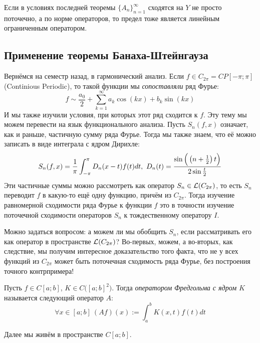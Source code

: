 \begin{corollary}
	Если в условиях последней теоремы $\{A_n\}_{n = 1}^\infty$ сходятся на $Y$ не просто поточечно, а по норме операторов, то предел тоже является линейным ограниченным оператором.
\end{corollary}

\subsection*{Применение теоремы Банаха-Штейнгауза}

\begin{problem}
	Вернёмся на семестр назад, в гармонический анализ. Если $f \in C_{2\pi} = CP[-\pi; \pi]$ (Continious Periodic), то такой функции мы \textit{сопоставляли} ряд Фурье:
	\[
		f \sim \frac{a_0}{2} + \sum_{k = 1}^\infty a_k\cos(kx) + b_k\sin(kx)
	\]
	И мы также изучили условия, при которых этот ряд сходится к $f$. Эту тему мы можем перевести на язык функционального анализа. Пусть $S_n(f, x)$ означает, как и раньше, частичную сумму ряда Фурье. Тогда мы также знаем, что её можно записать в виде интеграла с ядром Дирихле:
	\[
		S_n(f, x) = \frac{1}{\pi}\int_{-\pi}^\pi D_n(x - t)f(t)dt,\ D_n(t) = \frac{\sin\Big(\left(n + \frac{1}{2}\right)t\Big)}{2\sin\frac{t}{2}}
	\]
	Эти частичные суммы можно рассмотреть как оператор $S_n \in \mathcal{L}(C_{2\pi})$, то есть $S_n$ переводит $f$ в какую-то ещё одну функцию, причём из $C_{2\pi}$. Тогда изучение равномерной сходимости ряда Фурье к функции $f$ это в точности изучение поточечной сходимости операторов $S_n$ к тождественному оператору $I$.
	
	Можно задаться вопросом: а можем ли мы обобщить $S_n$, если рассматривать его как оператор в пространстве $\mathcal{L}(C_{2\pi})$? Во-первых, можем, а во-вторых, как следствие, мы получим интересное доказательство того факта, что не у всех функций из $C_{2\pi}$ может быть поточечная сходимость ряда Фурье, без построения точного контрпримера!
\end{problem}

\begin{definition}
	Пусть $f \in C[a; b]$, $K \in C\big([a; b]^2\big)$. Тогда \textit{оператором Фредгольма с ядром $K$} называется следующий оператор $A$:
	\[
		\forall x \in [a; b]\ (Af)(x) := \int_a^b K(x, t)f(t)dt
	\]
\end{definition}

\begin{note}
	Далее мы живём в пространстве $C[a; b]$.
\end{note}

